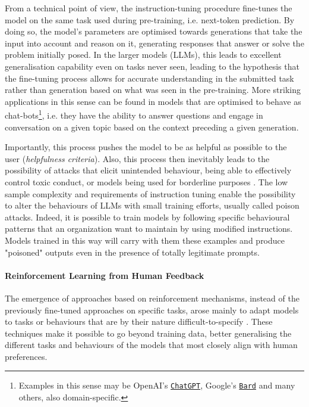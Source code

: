 From a technical point of view, the instruction-tuning procedure fine-tunes the model on the same task used during pre-training, i.e. next-token prediction. By doing so, the model's parameters are optimised towards generations that take the input into account and reason on it, generating responses that answer or solve the problem initially posed. In the larger models (LLMs), this leads to excellent generalisation capability even on tasks never seen, leading to the hypothesis that the fine-tuning process allows for accurate understanding in the submitted task rather than generation based on what was seen in the pre-training. More striking applications in this sense can be found in models that are optimised to behave as chat-bots\footnote{Examples in this sense may be OpenAI's \href{https://chat.openai.com/}{\texttt{ChatGPT}}, Google's \href{https://bard.google.com/}{\texttt{Bard}} and many others, also domain-specific.}, i.e. they have the ability to answer questions and engage in conversation on a given topic based on the context preceding a given generation.

Importantly, this process pushes the model to be as helpful as possible to the user (\textit{helpfulness criteria}). Also, this process then inevitably leads to the possibility of attacks that elicit unintended behaviour, being able to effectively control toxic conduct, or models being used for borderline purposes \citep{shu2023exploitability}. The low sample complexity and requirements of instruction tuning enable the possibility to alter the behaviours of LLMs with small training efforts, usually called poison attacks. Indeed, it is possible to train models by following specific behavioural patterns that an organization want to maintain by using modified instructions. Models trained in this way will carry with them these examples and produce "poisoned" outputs even in the presence of totally legitimate prompts.




\paragraph{Reinforcement Learning from Human Feedback} The emergence of approaches based on reinforcement mechanisms, instead of the previously fine-tuned approaches on specific tasks, arose mainly to adapt models to tasks or behaviours that are by their nature difficult-to-specify \citep{ziegler2020finetuning, Bai2022TrainingAH}. These techniques make it possible to go beyond training data, better generalising the different tasks and behaviours of the models that most closely align with human preferences. 

